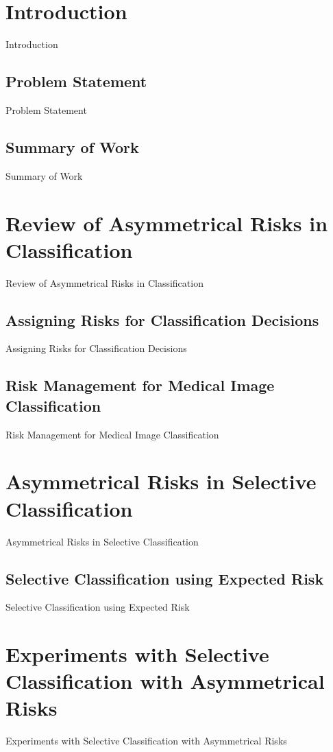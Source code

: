 \section{Introduction}
Introduction

\subsection{Problem Statement}
Problem Statement

\subsection{Summary of Work}
Summary of Work



\section{Review of Asymmetrical Risks in Classification}
Review of Asymmetrical Risks in Classification

\subsection{Assigning Risks for Classification Decisions}
Assigning Risks for Classification Decisions

\subsection{Risk Management for Medical Image Classification}
Risk Management for Medical Image Classification



\section{Asymmetrical Risks in Selective Classification}
Asymmetrical Risks in Selective Classification

\subsection{Selective Classification using Expected Risk}
Selective Classification using Expected Risk



\section{Experiments with Selective Classification with Asymmetrical Risks}
Experiments with Selective Classification with Asymmetrical Risks

